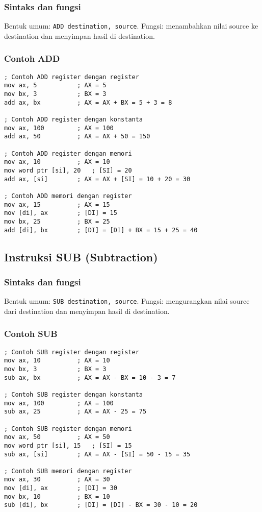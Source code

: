 \documentclass[../main.tex]{subfiles}
\begin{document}
            \subsubsection{Sintaks dan fungsi}
Bentuk umum: \texttt{ADD destination, source}. Fungsi: menambahkan nilai source ke destination dan menyimpan hasil di destination.

            \subsubsection{Contoh ADD}
\begin{lstlisting}[language={[x86masm]Assembler}, caption=Instruksi ADD, label={lst:add-examples}]
; Contoh ADD register dengan register
mov ax, 5           ; AX = 5
mov bx, 3           ; BX = 3
add ax, bx          ; AX = AX + BX = 5 + 3 = 8

; Contoh ADD register dengan konstanta
mov ax, 100         ; AX = 100
add ax, 50          ; AX = AX + 50 = 150

; Contoh ADD register dengan memori
mov ax, 10          ; AX = 10
mov word ptr [si], 20   ; [SI] = 20
add ax, [si]        ; AX = AX + [SI] = 10 + 20 = 30

; Contoh ADD memori dengan register
mov ax, 15          ; AX = 15
mov [di], ax        ; [DI] = 15
mov bx, 25          ; BX = 25
add [di], bx        ; [DI] = [DI] + BX = 15 + 25 = 40
\end{lstlisting}

        \subsection{Instruksi SUB (Subtraction)}
            \subsubsection{Sintaks dan fungsi}
Bentuk umum: \texttt{SUB destination, source}. Fungsi: mengurangkan nilai source dari destination dan menyimpan hasil di destination.

            \subsubsection{Contoh SUB}
\begin{lstlisting}[language={[x86masm]Assembler}, caption=Instruksi SUB, label={lst:sub-examples}]
; Contoh SUB register dengan register
mov ax, 10          ; AX = 10
mov bx, 3           ; BX = 3
sub ax, bx          ; AX = AX - BX = 10 - 3 = 7

; Contoh SUB register dengan konstanta
mov ax, 100         ; AX = 100
sub ax, 25          ; AX = AX - 25 = 75

; Contoh SUB register dengan memori
mov ax, 50          ; AX = 50
mov word ptr [si], 15   ; [SI] = 15
sub ax, [si]        ; AX = AX - [SI] = 50 - 15 = 35

; Contoh SUB memori dengan register
mov ax, 30          ; AX = 30
mov [di], ax        ; [DI] = 30
mov bx, 10          ; BX = 10
sub [di], bx        ; [DI] = [DI] - BX = 30 - 10 = 20
\end{lstlisting}
\end{document}
